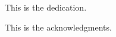 %
%
%
%
%

\begin{dedication}
  This is the dedication.
\end{dedication}

\begin{acknowledgments}
  This is the acknowledgments.
\end{acknowledgments}


\tableofcontents

\listoftables

